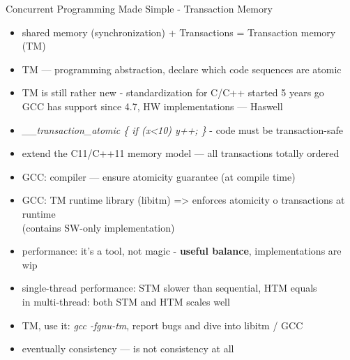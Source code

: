 \documentclass[aspectratio=169]{beamer}
\begin{document}
\begin{frame}{Concurrent Programming Made Simple - Transaction Memory}
  \begin{itemize}
  \item shared memory (synchronization) + Transactions = Transaction memory (TM)
  \item TM --- programming abstraction, declare which code sequences are atomic
  \item TM is still rather new - standardization for C/C++ started 5 years go
        \\GCC has support since 4.7, HW implementations --- Haswell
  \item {\it \_\_transaction\_atomic \{ if (x<10) y++; \}} - code must be transaction-safe
  \item extend the C11/C++11 memory model --- all transactions totally ordered
  \item GCC: compiler --- ensure atomicity guarantee (at compile time)
  \item GCC: TM runtime library (libitm) => enforces atomicity o transactions at runtime
        \\(contains SW-only implementation)
  \item performance: it's a tool, not magic - {\bf useful balance}, implementations are wip
  \item single-thread performance: STM slower than sequential, HTM equals
        \\in multi-thread: both STM and HTM scales well
  \item TM, use it: {\it gcc -fgnu-tm}, report bugs and dive into libitm / GCC
  \item eventually consistency --- is not consistency at all
  \end{itemize}
\end{frame}
\end{document}
